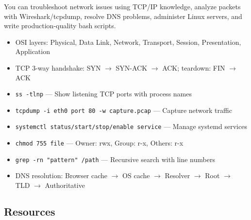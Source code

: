 \documentclass[11pt, a4paper, oneside]{report}
\begin{document}
\begin{microcheckpoint}
You can troubleshoot network issues using TCP/IP knowledge, analyze packets with Wireshark/tcpdump, resolve DNS problems, administer Linux servers, and write production-quality bash scripts.
\end{microcheckpoint}

\begin{cheatsheetbox}
\begin{itemize}[leftmargin=*]
\item OSI layers: Physical, Data Link, Network, Transport, Session, Presentation, Application
\item TCP 3-way handshake: SYN $\to$ SYN-ACK $\to$ ACK; teardown: FIN $\to$ ACK
\item \texttt{ss -tlnp} --- Show listening TCP ports with process names
\item \texttt{tcpdump -i eth0 port 80 -w capture.pcap} --- Capture network traffic
\item \texttt{systemctl status/start/stop/enable service} --- Manage systemd services
\item \texttt{chmod 755 file} --- Owner: rwx, Group: r-x, Others: r-x
\item \texttt{grep -rn "pattern" /path} --- Recursive search with line numbers
\item DNS resolution: Browser cache $\to$ OS cache $\to$ Resolver $\to$ Root $\to$ TLD $\to$ Authoritative
\end{itemize}
\end{cheatsheetbox}

\subsection*{Resources}
\end{document}
